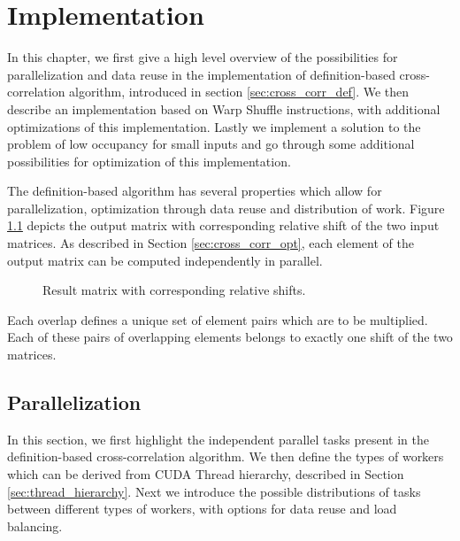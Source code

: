 \chapter{Implementation}

In this chapter, we first give a high level overview of the possibilities for parallelization and data reuse in the implementation of definition-based cross-correlation algorithm, introduced in section \ref{sec:cross_corr_def}. We then describe an implementation based on Warp Shuffle instructions, with additional optimizations of this implementation. Lastly we implement a solution to the problem of low occupancy for small inputs and go through some additional possibilities for optimization of this implementation.


The definition-based algorithm has several properties which allow for parallelization, optimization through data reuse and distribution of work. Figure \ref{fig:cross_corr_shifts} depicts the output matrix with corresponding relative shift of the two input matrices. As described in Section \ref{sec:cross_corr_opt}, each element of the output matrix can be computed independently in parallel.

\begin{figure}[ht]
	\centering
	\def\svgwidth{\textwidth}
	
	\caption{Result matrix with corresponding relative shifts.}
	\label{fig:cross_corr_shifts}
\end{figure}

Each overlap defines a unique set of element pairs which are to be multiplied. Each of these pairs of overlapping elements belongs to exactly one shift of the two matrices.


\section{Parallelization}
In this section, we first highlight the independent parallel tasks present in the definition-based cross-correlation algorithm.  We then define the types of workers which can be derived from CUDA Thread hierarchy, described in Section \ref{sec:thread_hierarchy}. Next we introduce the possible distributions of tasks between different types of workers, with options for data reuse and load balancing.

